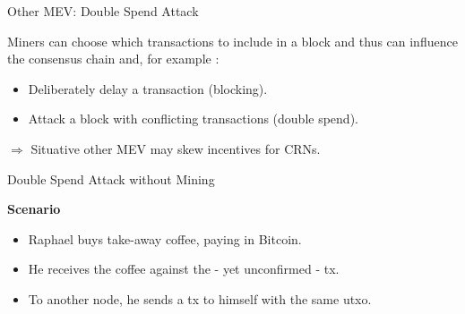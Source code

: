 \documentclass[handout]{beamer}
\begin{document}
\begin{frame}{Other MEV: Double Spend Attack}

Miners can choose which transactions to include in a block and thus can influence the consensus chain and, for example :
\begin{itemize}
	\item	Deliberately delay a transaction (blocking).
	\item	Attack a block with conflicting transactions (double spend).
\end{itemize}

\vspace{0.5 em}
$\Rightarrow$ Situative other MEV may skew incentives for CRNs.


\end{frame}

\begin{frame}{Double Spend Attack without Mining}

\textbf{Scenario}
\begin{itemize}
	\item	Raphael buys take-away coffee, paying in Bitcoin.
	\item	He receives the coffee against the - yet unconfirmed - tx.
	\item<2-> To another node, he sends a tx to himself with the same utxo.
\end{itemize}


\begin{center}
	\begin{tikzpicture}[scale=0.9, every node/.style ={scale=0.9}]
		
	\end{tikzpicture}
\end{center}


\end{frame}
\end{document}
